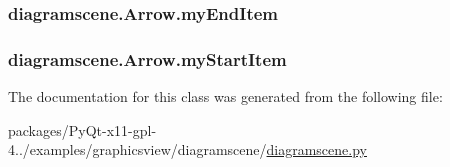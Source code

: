 \subsubsection[{my\+End\+Item}]{\setlength{\rightskip}{0pt plus 5cm}diagramscene.\+Arrow.\+my\+End\+Item}\label{classdiagramscene_1_1Arrow_ad31fdc2cc92b3b6a7ccd46fc668f8327}
\hypertarget{classdiagramscene_1_1Arrow_aa481b83d8dc8d6e67847f558447ac4f2}{}
\subsubsection[{my\+Start\+Item}]{\setlength{\rightskip}{0pt plus 5cm}diagramscene.\+Arrow.\+my\+Start\+Item}\label{classdiagramscene_1_1Arrow_aa481b83d8dc8d6e67847f558447ac4f2}


The documentation for this class was generated from the following file\+:\begin{DoxyCompactItemize}
\item 
packages/\+Py\+Qt-\/x11-\/gpl-\/4../examples/graphicsview/diagramscene/\hyperlink{diagramscene_8py}{diagramscene.\+py}\end{DoxyCompactItemize}
